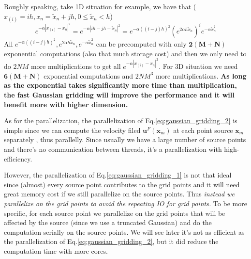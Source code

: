 \documentclass{article}[12pt]
\begin{document}
Roughly speaking, take 1D situation for example, we have that ($x_{(i)} = ih, x_n = \tilde{x}_n + jh, 0 \le \tilde{x}_n < h$)
\begin{equation}
e^{-\alpha|x_{(i)} - x_n|^2} = e^{-\alpha|ih - jh - \tilde{x}_n|^2} = e^{-\alpha ((i-j)h)^2} \left(e^{2 \alpha h \tilde{x}_n}\right)^i e^{-\alpha \tilde{x}_n^2}
\end{equation}
All $e^{-\alpha ((i-j)h)^2}, e^{2 \alpha h \tilde{x}_n}, e^{-\alpha \tilde{x}_n^2}$ can be precomputed with only $\mathbf{2(M+N)}$ exponential computations (also that much storage cost) and then we only need to do $2 NM$ more multiplications to get all $e^{-\alpha|x_{(i)} - x_n|^2}$. For 3D situation we need $\mathbf{6(M+N)}$ exponential computations and $2 NM^3$ more multiplications. \textbf{As long as the exponential takes significantly more time than multiplication, the fast Gaussian gridding will improve the performance and it will benefit more with higher dimension.}

As for the parallelization, the parallelization of Eq.\eqref{eq:gaussian_gridding_2} is simple since we can compute the velocity filed $\mathbf{u}^F (\mathbf{x}_m)$ at each point source $\mathbf{x}_m$ separately , thus parallelly. Since usually we have a large number of source points and there's no communication between threads, it's a parallelization with high-efficiency.

However, the parallelization of Eq.\eqref{eq:gaussian_gridding_1} is not that ideal since (almost) every source point contributes to the grid points and it will need great memory cost if we still parallelize on the source points. Thus \textit{instead we parallelize on the grid points to avoid the repeating IO for grid points.} To be more specific, for each source point we parallelize on the grid points that will be affected by the source (since we use a truncated Gaussian) and do the computation serially on the source points. We will see later it's not as efficient as the parallelization of Eq.\eqref{eq:gaussian_gridding_2}, but it did reduce the computation time with more cores.
\end{document}

